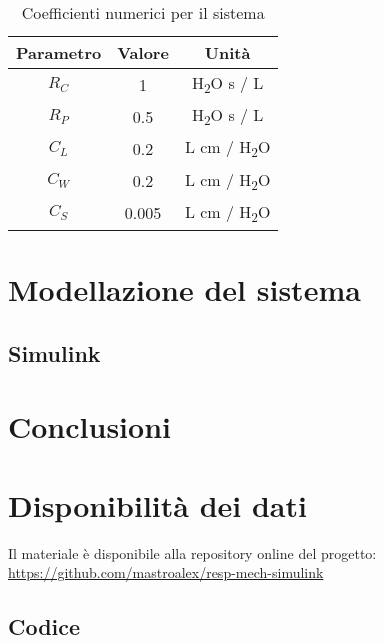 \begin{table}[!ht]
	\centering
	\begin{tabular}{|c|c|c|}
		\hline
		Parametro & Valore & Unità \\ \hline
		$R_C$ & 1 & H\textsubscript{2}O s / L \\ \hline
		$R_P$ & 0.5 & H\textsubscript{2}O s / L \\ \hline
		$C_L$ & 0.2 & L cm / H\textsubscript{2}O \\ \hline
		$C_W$ & 0.2 & L cm / H\textsubscript{2}O \\ \hline
		$C_S$ & 0.005 & L cm / H\textsubscript{2}O \\ \hline
	\end{tabular}
\caption{Coefficienti numerici per il sistema \cite{khoo_physiological_2018}}
\label{tab:coefficienti}
\end{table}

\section{Modellazione del sistema}

\subsection{Simulink}



\section{Conclusioni}


\section*{Disponibilità dei dati}

Il materiale è disponibile alla repository online del progetto: \url{https://github.com/mastroalex/resp-mech-simulink}

\subsection*{Codice}

\raggedbottom

\pagebreak
\printbibliography[title=Riferimenti]




